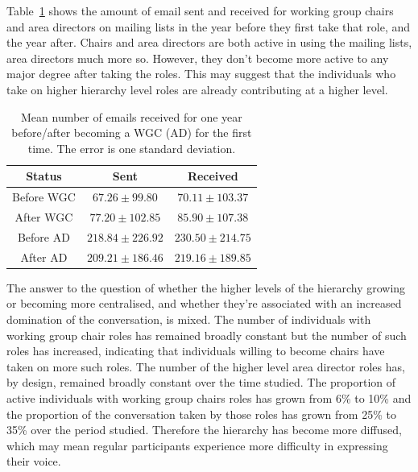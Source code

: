 \documentclass[twocolumn,10pt]{article}
\newcommand{\pb}[1]{\vspace{0.75ex}\noindent{\textbf{#1}}}
\begin{document}
\pb{Activity prior to appointment:}
Table~\ref{tab:WGC_email} shows the amount of email sent and received for
working group chairs and area directors on mailing lists in the year before
they first take that role, and the year after. Chairs and area directors
are both active in using the mailing lists, area directors much more so.
However, they don't become more active to any major degree after taking the
roles. This may suggest that the individuals who take on higher hierarchy
level roles are already contributing at a higher level.

\begin{table}[!tbp]
\centering
    \begin{tabular}{c||c|c}
        Status & Sent & Received \\
         \hline \hline 
        Before WGC & $67.26\pm99.80$ & $70.11\pm103.37$ \\
        \hline
        After WGC & $77.20\pm102.85$ & $85.90\pm107.38$ \\
        \hline
        Before AD & $218.84\pm226.92$ & $230.50\pm214.75$ \\
        \hline
        After AD & $209.21\pm186.46$ & $219.16\pm189.85$ \\
    \end{tabular}
        \caption{Mean number of emails received for one year before/after becoming a WGC (AD) for the first time. The error is one standard deviation.}
    \label{tab:WGC_email}
\end{table}

\pb{Summary}
The answer to the question of whether the higher levels of the hierarchy
growing or becoming more centralised, and whether they're associated with
an increased domination of the conversation, is mixed.  The number of
individuals with working group chair roles has remained broadly constant
but the number of such roles has increased, indicating that individuals
willing to become chairs have taken on more such roles.  The number of the
higher level area director roles has, by design, remained broadly constant
over the time studied. The proportion of active individuals with working
group chairs roles has grown from 6\% to 10\% and the proportion of the
conversation taken by those roles has grown from 25\% to 35\% over the
period studied. Therefore the hierarchy has become more diffused, which may
mean regular participants experience more difficulty in expressing their
voice.
\end{document}
